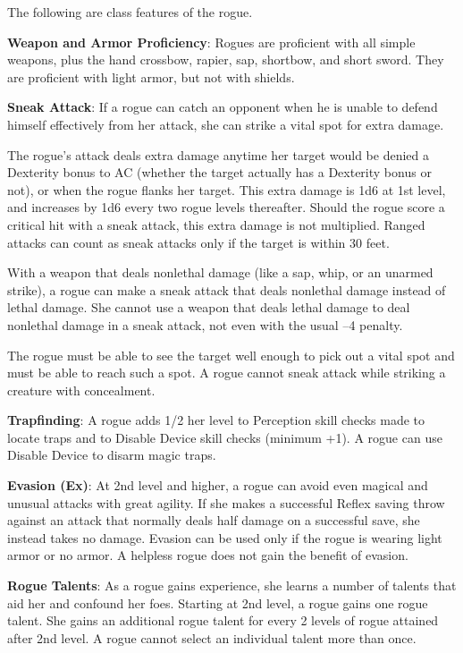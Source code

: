 				
The following are class features of the rogue.
				
\textbf{Weapon and Armor Proficiency}: Rogues are proficient with all simple weapons, plus the hand crossbow, rapier, sap, shortbow, and short sword. They are proficient with light armor, but not with shields.
				
\textbf{Sneak Attack}: If a rogue can catch an opponent when he is unable to defend himself effectively from her attack, she can strike a vital spot for extra damage.
				
The rogue's attack deals extra damage anytime her target would be denied a Dexterity bonus to AC (whether the target actually has a Dexterity bonus or not), or when the rogue flanks her target. This extra damage is 1d6 at 1st level, and increases by 1d6 every two rogue levels thereafter. Should the rogue score a critical hit with a sneak attack, this extra damage is not multiplied. Ranged attacks can count as sneak attacks only if the target is within 30 feet.
				
With a weapon that deals nonlethal damage (like a sap, whip, or an unarmed strike), a rogue can make a sneak attack that deals nonlethal damage instead of lethal damage. She cannot use a weapon that deals lethal damage to deal nonlethal damage in a sneak attack, not even with the usual --4 penalty.
				
The rogue must be able to see the target well enough to pick out a vital spot and must be able to reach such a spot. A rogue cannot sneak attack while striking a creature with concealment.
				
\textbf{Trapfinding}: A rogue adds 1/2 her level to Perception skill checks made to locate traps and to Disable Device skill checks (minimum +1). A rogue can use Disable Device to disarm magic traps.
				
\textbf{Evasion (Ex)}: At 2nd level and higher, a rogue can avoid even magical and unusual attacks with great agility. If she makes a successful Reflex saving throw against an attack that normally deals half damage on a successful save, she instead takes no damage. Evasion can be used only if the rogue is wearing light armor or no armor. A helpless rogue does not gain the benefit of evasion.
				
\textbf{Rogue Talents}: As a rogue gains experience, she learns a number of talents that aid her and confound her foes. Starting at 2nd level, a rogue gains one rogue talent. She gains an additional rogue talent for every 2 levels of rogue attained after 2nd level. A rogue cannot select an individual talent more than once.
				
